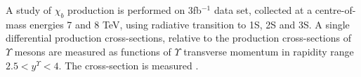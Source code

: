 A study of $\chi_b$ production is performed on 3fb$^{-1}$ data set, collected
at a centre-of-mass energies 7 and 8 TeV, using \chib radiative transition to
\Y1S, \Y2S and \Y3S. A single differential
production cross-sections, relative to the production cross-sections of
$\Upsilon$ mesons are measured as functions of $\Upsilon$ transverse momentum
in rapidity range $2.5 < y^{\Upsilon} < 4$. The cross-section is
measured 
.